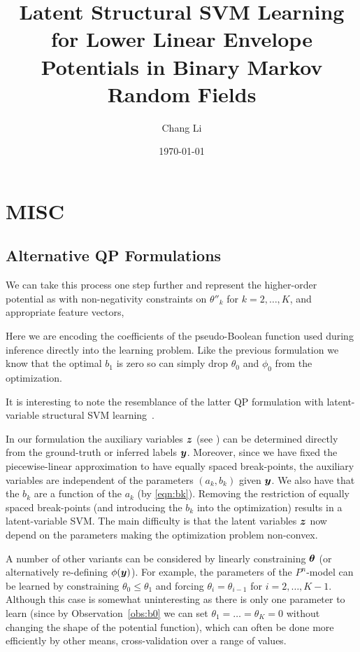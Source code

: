 \documentclass[twoside,doublespace,onecolumn,11pt,a4paper]{book}
\title{Latent Structural SVM Learning for Lower Linear
  Envelope Potentials in Binary Markov Random Fields}
\author{Chang Li} \date{\today}
\renewcommand{\cite}{\citep}
\begin{document}
\section{MISC}
\label{sec:MISC}

\subsection{Alternative QP Formulations}

We can take this process one step further and represent the
higher-order potential as with non-negativity constraints on
$\theta''_k$ for $k = 2, \ldots, K$, and appropriate feature
vectors, \ie

Here we are encoding the coefficients of the pseudo-Boolean
function used during inference directly into the learning
problem. Like the previous formulation we know that the optimal
$b_1$ is zero so can simply drop $\theta_0$ and $\phi_0$ from the
optimization.

It is interesting to note the resemblance of the latter QP
formulation with latent-variable structural SVM
learning~\cite{Yu:ICML09}.

In our formulation the auxiliary variables ${\boldsymbol{z}}$ (see
) can be determined directly from the
ground-truth or inferred labels ${\boldsymbol{y}}$. Moreover, since we have
fixed the piecewise-linear approximation to have equally spaced
break-points, the auxiliary variables are independent of the
parameters $(a_k, b_k)$ given ${\boldsymbol{y}}$. We also have that the $b_k$
are a function of the $a_k$ (by \eqref{eqn:bk}). Removing the
restriction of equally spaced break-points (and introducing the
$b_k$ into the optimization) results in a latent-variable SVM.
The main difficulty is that the latent variables ${\boldsymbol{z}}$ now depend
on the parameters making the optimization problem non-convex.

A number of other variants can be considered by linearly
constraining $\boldsymbol{\theta}$ (or alternatively re-defining
$\phi({\boldsymbol{y}})$). For example, the parameters of the $P^{n}$-model
can be learned by constraining $\theta_0 \leq \theta_1$ and
forcing $\theta_i = \theta_{i-1}$ for $i = 2, \ldots, K - 1$.
Although this case is somewhat uninteresting as there is only one
parameter to learn (since by Observation~\ref{obs:b0} we can set
$\theta_1 = \ldots = \theta_K = 0$ without changing the shape of
the potential function), which can often be done more efficiently
by other means, \eg cross-validation over a range of values.
\end{document}
